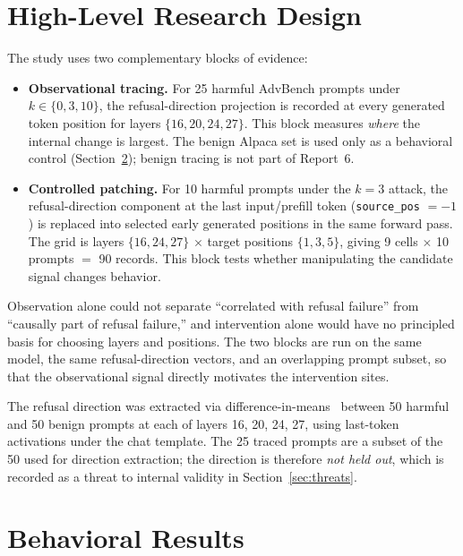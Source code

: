 \documentclass{article}
\begin{document}
\section{High-Level Research Design}
\label{sec:design}

The study uses two complementary blocks of evidence:

\begin{itemize}
\item \textbf{Observational tracing.} For 25 harmful AdvBench prompts under
  $k\in\{0, 3, 10\}$, the refusal-direction projection is recorded at every
  generated token position for layers $\{16, 20, 24, 27\}$. This block
  measures \emph{where} the internal change is largest. The benign Alpaca
  set is used only as a behavioral control (Section~\ref{sec:behavior});
  benign tracing is not part of Report~6.
\item \textbf{Controlled patching.} For 10 harmful prompts under the $k=3$
  attack, the refusal-direction component at the last input/prefill token
  (\texttt{source\_pos} $=-1$) is replaced into selected early generated
  positions in the same forward pass. The grid is layers $\{16, 24, 27\}$
  $\times$ target positions $\{1, 3, 5\}$, giving 9 cells $\times$ 10 prompts
  $=$ 90 records. This block tests whether manipulating the candidate signal
  changes behavior.
\end{itemize}

Observation alone could not separate ``correlated with refusal failure'' from
``causally part of refusal failure,'' and intervention alone would have no
principled basis for choosing layers and positions. The two blocks are run on
the same model, the same refusal-direction vectors, and an overlapping prompt
subset, so that the observational signal directly motivates the intervention
sites.

The refusal direction was extracted via difference-in-means~\cite{arditi2024refusal}
between 50 harmful and 50 benign prompts at each of layers 16, 20, 24, 27,
using last-token activations under the chat template. The 25 traced prompts
are a subset of the 50 used for direction extraction; the direction is
therefore \emph{not held out}, which is recorded as a threat to internal
validity in Section~\ref{sec:threats}.

\section{Behavioral Results}
\label{sec:behavior}
\end{document}

